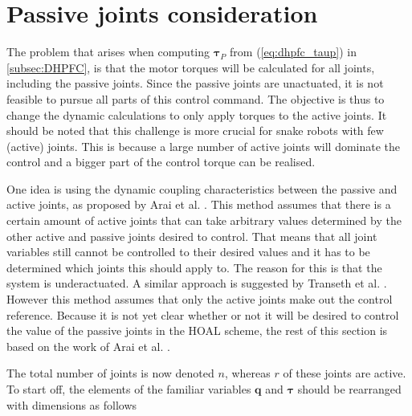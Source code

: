 \section{Passive joints consideration}\label{subsec:passive-joints}

The problem that arises when computing $\boldsymbol{\tau}_P$ from (\ref{eq:dhpfc_taup}) in \ref{subsec:DHPFC}, is that the motor torques will be calculated for all joints, including the passive joints. Since the passive joints are unactuated, it is not feasible to pursue all parts of this control command. The objective is thus to change the dynamic calculations to only apply torques to the active joints. It should be noted that this challenge is more crucial for snake robots with few (active) joints. This is because a large number of active joints will dominate the control and a bigger part of the control torque can be realised.

One idea is using the dynamic coupling characteristics between the passive and active joints, as proposed by Arai et al. \cite{arai1991position}. This method assumes that there is a certain amount of active joints that can take arbitrary values determined by the other active and passive joints desired to control. That means that all joint variables still cannot be controlled to their desired values and it has to be determined which joints this should apply to. The reason for this is that the system is underactuated. A similar approach is suggested by Transeth et al. \cite{transeth2007tracking}. However this method assumes that only the active joints make out the control reference. Because it is not yet clear whether or not it will be desired to control the value of the passive joints in the HOAL scheme, the rest of this section is based on the work of Arai et al. \cite{arai1991position}.

The total number of joints is now denoted $n$, whereas $r$ of these joints are active. To start off, the elements of the familiar variables $\mathbf{q}$ and $\boldsymbol{\tau}$ should be rearranged with dimensions as follows

